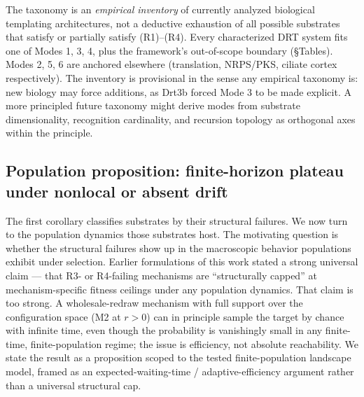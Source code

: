 \documentclass[aps,prx,reprint,amsmath,amssymb,floatfix,superscriptaddress,nofootinbib]{revtex4-2}
\theoremstyle{plain-thm}
\theoremstyle{definition-thm}
\begin{document}
The taxonomy is an \emph{empirical inventory} of currently analyzed biological templating architectures, not a deductive exhaustion of all possible substrates that satisfy or partially satisfy (R1)--(R4). Every characterized DRT system fits one of Modes 1, 3, 4, plus the framework's out-of-scope boundary (\S Tables). Modes 2, 5, 6 are anchored elsewhere (translation, NRPS/PKS, ciliate cortex respectively). The inventory is provisional in the sense any empirical taxonomy is: new biology may force additions, as Drt3b forced Mode 3 to be made explicit. A more principled future taxonomy might derive modes from substrate dimensionality, recognition cardinality, and recursion topology as orthogonal axes within the principle.

\subsection{Population proposition: finite-horizon plateau under nonlocal or absent drift}

The first corollary classifies substrates by their structural failures. We now turn to the population dynamics those substrates host. The motivating question is whether the structural failures show up in the macroscopic behavior populations exhibit under selection. Earlier formulations of this work stated a strong universal claim --- that R3- or R4-failing mechanisms are ``structurally capped'' at mechanism-specific fitness ceilings under any population dynamics. That claim is too strong. A wholesale-redraw mechanism with full support over the configuration space (M2 at $r > 0$) can in principle sample the target by chance with infinite time, even though the probability is vanishingly small in any finite-time, finite-population regime; the issue is efficiency, not absolute reachability. We state the result as a proposition scoped to the tested finite-population landscape model, framed as an expected-waiting-time / adaptive-efficiency argument rather than a universal structural cap.
\end{document}

